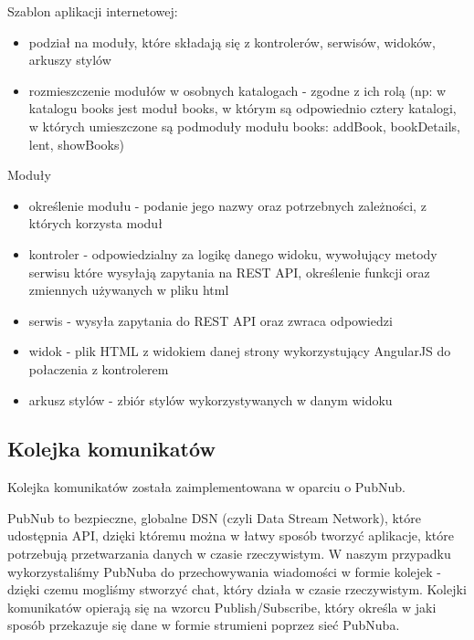 \documentclass{report}
\begin{document}
		Szablon aplikacji internetowej:
		\begin{itemize}
		\item podział na moduły, które składają się z kontrolerów, serwisów, widoków, arkuszy stylów
		\item rozmieszczenie modułów w osobnych katalogach - zgodne z ich rolą (np: w katalogu books jest moduł books, w którym są odpowiednio cztery katalogi, w których umieszczone są podmoduły modułu books: addBook, bookDetails, lent, showBooks)
		\end{itemize}
		
		Moduły
		\begin{itemize}
		\item określenie modułu - podanie jego nazwy oraz potrzebnych zależności, z których korzysta moduł
		\item kontroler - odpowiedzialny za logikę danego widoku, wywołujący metody serwisu które wysyłają zapytania na REST API, określenie funkcji oraz zmiennych używanych w pliku html
		\item serwis - wysyła zapytania do REST API oraz zwraca odpowiedzi
		\item widok - plik HTML z widokiem danej strony wykorzystujący AngularJS do połaczenia z kontrolerem
		\item arkusz stylów - zbiór stylów wykorzystywanych w danym widoku
		\end{itemize}
	
		\subsection{Kolejka komunikatów}
		
		Kolejka komunikatów została zaimplementowana w oparciu o PubNub.
			
		PubNub to bezpieczne, globalne DSN (czyli Data Stream Network), które udostępnia API, dzięki któremu można w łatwy sposób tworzyć aplikacje, które potrzebują przetwarzania danych w czasie rzeczywistym. W naszym przypadku wykorzystaliśmy PubNuba do przechowywania wiadomości w formie kolejek - dzięki czemu mogliśmy stworzyć chat, który działa w czasie rzeczywistym.
		Kolejki komunikatów opierają się na wzorcu Publish/Subscribe, który określa w jaki sposób przekazuje się dane w formie strumieni poprzez sieć PubNuba. 
		
\end{document}

